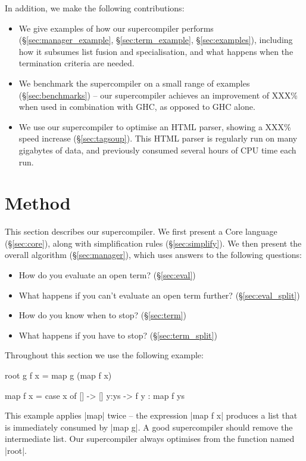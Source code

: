 \documentclass[draft]{sigplanconf}
\newcommand{\unknown}{XXX}
\begin{document}
In addition, we make the following contributions:

\begin{itemize}
\item We give examples of how our supercompiler performs (\S\ref{sec:manager_example}, \S\ref{sec:term_example}, \S\ref{sec:examples}), including how it subsumes list fusion and specialisation, and what happens when the termination criteria are needed.
\item We benchmark the supercompiler on a small range of examples (\S\ref{sec:benchmarks}) -- our supercompiler achieves an improvement of \unknown{}\% when used in combination with GHC, as opposed to GHC alone.
\item We use our supercompiler to optimise an HTML parser, showing a \unknown{}\% speed increase (\S\ref{sec:tagsoup}). This HTML parser is regularly run on many gigabytes of data, and previously consumed several hours of CPU time each run.
\end{itemize}

\section{Method}
\label{sec:method}

This section describes our supercompiler. We first present a Core language (\S\ref{sec:core}), along with simplification rules (\S\ref{sec:simplify}). We then present the overall algorithm (\S\ref{sec:manager}), which uses answers to the following questions:

\begin{itemize}
\item How do you evaluate an open term? (\S\ref{sec:eval})
\item What happens if you can't evaluate an open term further? (\S\ref{sec:eval_split})
\item How do you know when to stop? (\S\ref{sec:term})
\item What happens if you have to stop? (\S\ref{sec:term_split})
\end{itemize}

\noindent Throughout this section we use the following example:

\begin{code}
root g f x = map g (map f x)

map f x = case  x of
                []    -> []
                y:ys  -> f y : map f ys
\end{code}

This example applies |map| twice -- the expression |map f x| produces a list that is immediately consumed by |map g|. A good supercompiler should remove the intermediate list. Our supercompiler always optimises from the function named |root|.
\end{document}
